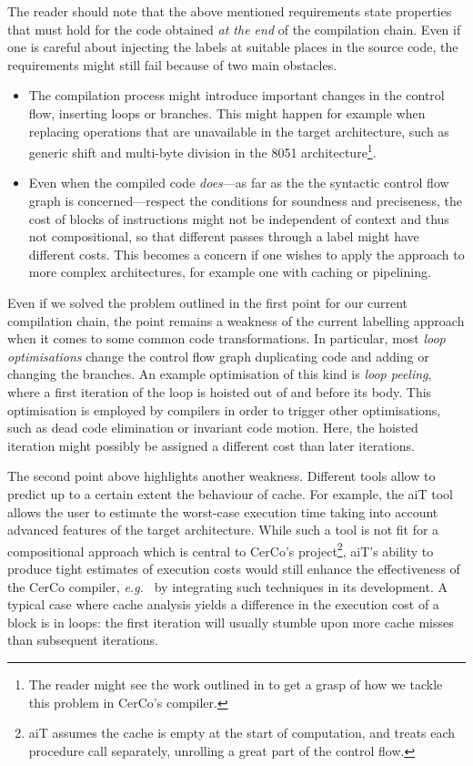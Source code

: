 \documentclass[submission,copyright,creativecommons]{eptcs}
\theoremstyle{definition}
\newcommand{\s}[1]{{\sf #1}}    \newcommand{\vc}[1]{{\bf #1}}
\newcommand{\eg}{\emph{e.g.\ }}
\begin{document}
The reader should note that the above mentioned requirements state properties
that must hold for the code obtained \emph{at the end} of the compilation chain.
Even if one is careful about injecting the labels at suitable places in the source
code, the requirements might still fail because of two main obstacles.
\begin{itemize}
\item
The compilation process might introduce important changes in the control flow, inserting loops or branches.
This might happen for example when replacing operations that are unavailable in the target architecture, such as
generic shift and multi-byte division in the 8051 architecture\footnote{The reader might see the work outlined in \cite{D2.2} to get a grasp of how we tackle this problem in CerCo's compiler.}.
\item
Even when the compiled code \emph{does}---as far as the the syntactic control flow graph is concerned---respect the conditions for soundness and preciseness, the cost of blocks of instructions might not be
independent of context and thus not compositional, so that different passes through a label might have different costs.
This becomes a concern if one wishes to apply the approach to more complex architectures, for example one with caching or pipelining.
\end{itemize}
Even if we solved the problem outlined in the first point for our current compilation chain, the point remains
a weakness of the current labelling approach when it comes to some common code transformations.
In particular, most \emph{loop optimisations} change the control flow graph duplicating code and adding or changing the branches.
An example optimisation of this kind is \emph{loop peeling}, where a first iteration of the loop is hoisted out of and before its body.
This optimisation is employed by compilers in order to trigger other optimisations, such as dead code elimination or invariant code motion.
Here, the hoisted iteration might possibly be assigned a different cost than later iterations.

The second point above highlights another weakness. Different tools allow to predict up to a certain extent the behaviour of cache.
For example, the \s{aiT} tool~\cite{absint} allows the user to estimate the worst-case execution time taking into account advanced features of the target architecture. While
such a tool is not fit for a compositional approach which is central to CerCo's project\footnote{\s{aiT} assumes the cache is empty at the start of computation, and treats each procedure call separately, unrolling a great part of the control flow.},
\s{aiT}'s ability to produce tight estimates of execution costs would still enhance the effectiveness of the CerCo compiler, \eg{} by integrating such techniques in its development.
A typical case where cache analysis yields a difference in the execution cost of a block is in loops: the first iteration will usually stumble upon more cache misses than subsequent iterations.
\end{document}
